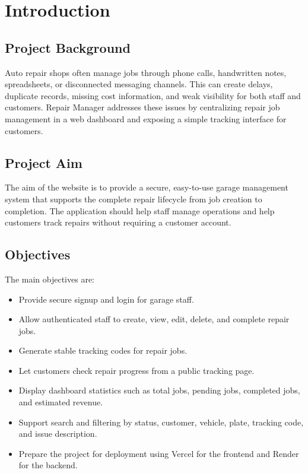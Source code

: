 \documentclass[12pt,a4paper]{report}
\newcommand{\projectname}{Repair Manager}
\begin{document}
\chapter{Introduction}

\section{Project Background}

Auto repair shops often manage jobs through phone calls, handwritten notes, spreadsheets, or disconnected messaging channels. This can create delays, duplicate records, missing cost information, and weak visibility for both staff and customers. \projectname{} addresses these issues by centralizing repair job management in a web dashboard and exposing a simple tracking interface for customers.

\section{Project Aim}

The aim of the website is to provide a secure, easy-to-use garage management system that supports the complete repair lifecycle from job creation to completion. The application should help staff manage operations and help customers track repairs without requiring a customer account.

\section{Objectives}

The main objectives are:

\begin{itemize}
  \item Provide secure signup and login for garage staff.
  \item Allow authenticated staff to create, view, edit, delete, and complete repair jobs.
  \item Generate stable tracking codes for repair jobs.
  \item Let customers check repair progress from a public tracking page.
  \item Display dashboard statistics such as total jobs, pending jobs, completed jobs, and estimated revenue.
  \item Support search and filtering by status, customer, vehicle, plate, tracking code, and issue description.
  \item Prepare the project for deployment using Vercel for the frontend and Render for the backend.
\end{itemize}
\end{document}
